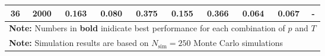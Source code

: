 \begin{landscape}
\begin{table}[p]
\begin{tabular}{cccccccccc}
	 36  & 2000 &       0.163        & 0.080                     &            0.375            &           0.155           &            0.366            & \textbf{0.064}         &          0.067           & -                 \\
	\hline
	\hline
    \multicolumn{10}{l}{\textbf{Note:} Numbers in \textbf{bold} inidicate best performance for each combination of $p$ and $T$} \\
    \multicolumn{10}{l}{\textbf{Note:} Simulation results are based on $N_\text{sim} = 250$ Monte Carlo simulations}
    \end{tabular}
    \end{table}
    \egroup
\end{landscape}
    